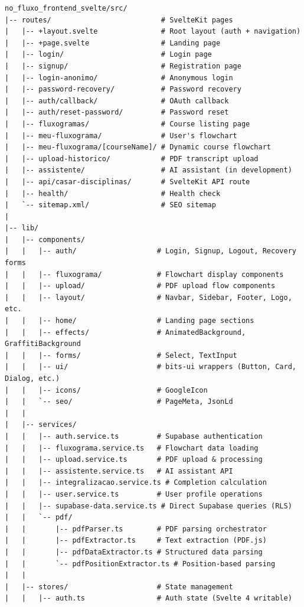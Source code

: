 \documentclass[11pt,a4paper]{article}
\begin{document}
\begin{lstlisting}
no_fluxo_frontend_svelte/src/
|-- routes/                          # SvelteKit pages
|   |-- +layout.svelte               # Root layout (auth + navigation)
|   |-- +page.svelte                 # Landing page
|   |-- login/                       # Login page
|   |-- signup/                      # Registration page
|   |-- login-anonimo/               # Anonymous login
|   |-- password-recovery/           # Password recovery
|   |-- auth/callback/               # OAuth callback
|   |-- auth/reset-password/         # Password reset
|   |-- fluxogramas/                 # Course listing page
|   |-- meu-fluxograma/              # User's flowchart
|   |-- meu-fluxograma/[courseName]/ # Dynamic course flowchart
|   |-- upload-historico/            # PDF transcript upload
|   |-- assistente/                  # AI assistant (in development)
|   |-- api/casar-disciplinas/       # SvelteKit API route
|   |-- health/                      # Health check
|   `-- sitemap.xml/                 # SEO sitemap
|
|-- lib/
|   |-- components/
|   |   |-- auth/                   # Login, Signup, Logout, Recovery forms
|   |   |-- fluxograma/             # Flowchart display components
|   |   |-- upload/                 # PDF upload flow components
|   |   |-- layout/                 # Navbar, Sidebar, Footer, Logo, etc.
|   |   |-- home/                   # Landing page sections
|   |   |-- effects/                # AnimatedBackground, GraffitiBackground
|   |   |-- forms/                  # Select, TextInput
|   |   |-- ui/                     # bits-ui wrappers (Button, Card, Dialog, etc.)
|   |   |-- icons/                  # GoogleIcon
|   |   `-- seo/                    # PageMeta, JsonLd
|   |
|   |-- services/
|   |   |-- auth.service.ts         # Supabase authentication
|   |   |-- fluxograma.service.ts   # Flowchart data loading
|   |   |-- upload.service.ts       # PDF upload & processing
|   |   |-- assistente.service.ts   # AI assistant API
|   |   |-- integralizacao.service.ts # Completion calculation
|   |   |-- user.service.ts         # User profile operations
|   |   |-- supabase-data.service.ts # Direct Supabase queries (RLS)
|   |   `-- pdf/
|   |       |-- pdfParser.ts        # PDF parsing orchestrator
|   |       |-- pdfExtractor.ts     # Text extraction (PDF.js)
|   |       |-- pdfDataExtractor.ts # Structured data parsing
|   |       `-- pdfPositionExtractor.ts # Position-based parsing
|   |
|   |-- stores/                     # State management
|   |   |-- auth.ts                 # Auth state (Svelte 4 writable)

\end{lstlisting}
\end{document}
